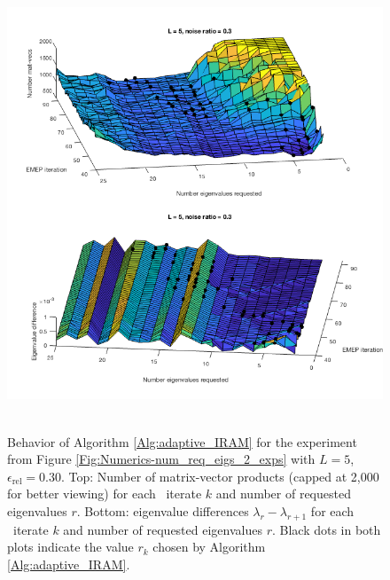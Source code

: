 \begin{figure}[H]
\centering
\hbox{\hspace{-0.5cm} \includegraphics[scale=0.65]{Numerics-surf_num_mvs_and_eig_diffs_2} }\vspace{0.0cm}
	\caption{Behavior of Algorithm \ref{Alg:adaptive_IRAM} for the experiment from Figure \ref{Fig:Numerics-num_req_eigs_2_exps} with $L=5$, $\epsilon_\text{rel}=0.30$.  Top: Number of matrix-vector products (capped at 2,000 for better viewing) for each \emep \ iterate $k$ and number of requested eigenvalues $r$. Bottom: eigenvalue differences $\lambda_r - \lambda_{r+1}$ for each \emep \ iterate $k$ and number of requested eigenvalues $r$.  Black dots in both plots indicate the value $r_k$ chosen by Algorithm \ref{Alg:adaptive_IRAM}.}
\label{Fig:Numerics-surf_mvs_eig_diffs_2}
\end{figure}






